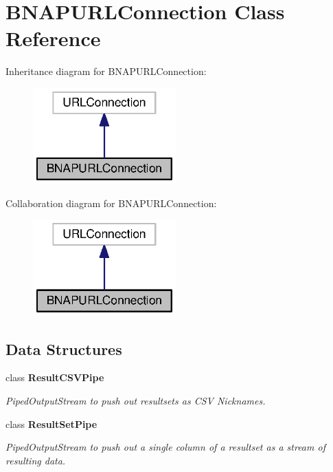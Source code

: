 \section{B\+N\+A\+P\+U\+R\+L\+Connection Class Reference}
\label{classorg_1_1smallfoot_1_1parser_1_1bnapsql_1_1BNAPURLConnection}


Inheritance diagram for B\+N\+A\+P\+U\+R\+L\+Connection\+:\nopagebreak
\begin{figure}[H]
\begin{center}
\leavevmode
\includegraphics[width=156pt]{classorg_1_1smallfoot_1_1parser_1_1bnapsql_1_1BNAPURLConnection__inherit__graph}
\end{center}
\end{figure}


Collaboration diagram for B\+N\+A\+P\+U\+R\+L\+Connection\+:\nopagebreak
\begin{figure}[H]
\begin{center}
\leavevmode
\includegraphics[width=156pt]{classorg_1_1smallfoot_1_1parser_1_1bnapsql_1_1BNAPURLConnection__coll__graph}
\end{center}
\end{figure}
\subsection*{Data Structures}
\begin{DoxyCompactItemize}
\item 
class {\bfseries Result\+C\+S\+V\+Pipe}
\begin{DoxyCompactList}\small\item\em Piped\+Output\+Stream to push out resultsets as C\+S\+V Nicknames. \end{DoxyCompactList}\item 
class {\bfseries Result\+Set\+Pipe}
\begin{DoxyCompactList}\small\item\em Piped\+Output\+Stream to push out a single column of a resultset as a stream of resulting data. \end{DoxyCompactList}\end{DoxyCompactItemize}
